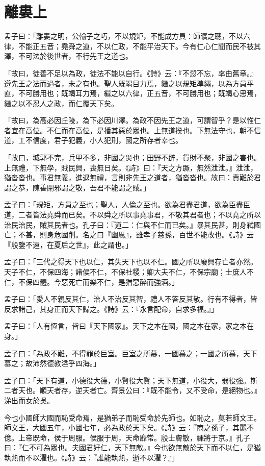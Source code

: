 \documentclass[12pt,a4paper]{ctexbook}
\begin{document}
\section{離婁上}
孟子曰：「離婁之明，公輸子之巧，不以規矩，不能成方員：師曠之聰，不以六律，不能正五音；堯舜之道，不以仁政，不能平治天下。今有仁心仁聞而民不被其澤，不可法於後世者，不行先王之道也。\par
「故曰，徒善不足以為政，徒法不能以自行。《詩》云：『不愆不忘，率由舊章。』遵先王之法而過者，未之有也。聖人既竭目力焉，繼之以規矩準繩，以為方員平直，不可勝用也；既竭耳力焉，繼之以六律，正五音，不可勝用也；既竭心思焉，繼之以不忍人之政，而仁覆天下矣。\par
「故曰，為高必因丘陵，為下必因川澤。為政不因先王之道，可謂智乎？是以惟仁者宜在高位。不仁而在高位，是播其惡於眾也。上無道揆也。下無法守也，朝不信道，工不信度，君子犯義，小人犯刑，國之所存者幸也。\par
「故曰，城郭不完，兵甲不多，非國之災也；田野不辟，貨財不聚，非國之害也。上無禮，下無學，賊民興，喪無日矣。《詩》曰：『天之方蹶，無然泄泄。』泄泄，猶沓沓也。事君無義，進退無禮，言則非先王之道者，猶沓沓也。故曰：責難於君謂之恭，陳善閉邪謂之敬，吾君不能謂之賊。」\par
孟子曰：「規矩，方員之至也；聖人，人倫之至也。欲為君盡君道，欲為臣盡臣道，二者皆法堯舜而已矣。不以舜之所以事堯事君，不敬其君者也；不以堯之所以治民治民，賊其民者也。孔子曰：『道二：仁與不仁而已矣。』暴其民甚，則身弒國亡；不甚，則身危國削。名之曰『幽厲』，雖孝子慈孫，百世不能改也。《詩》云『殷鑒不遠，在夏后之世』，此之謂也。」\par
孟子曰：「三代之得天下也以仁，其失天下也以不仁。國之所以廢興存亡者亦然。天子不仁，不保四海；諸侯不仁，不保社稷；卿大夫不仁，不保宗廟；士庶人不仁，不保四體。今惡死亡而樂不仁，是猶惡醉而強酒。」\par
孟子曰：「愛人不親反其仁，治人不治反其智，禮人不答反其敬。行有不得者，皆反求諸己，其身正而天下歸之。《詩》云：『永言配命，自求多福。』」\par
孟子曰：「人有恆言，皆曰『天下國家』。天下之本在國，國之本在家，家之本在身。」\par
孟子曰：「為政不難，不得罪於巨室。巨室之所慕，一國慕之；一國之所慕，天下慕之；故沛然德教溢乎四海。」\par
孟子曰：「天下有道，小德役大德，小賢役大賢；天下無道，小役大，弱役強。斯二者天也。順天者存，逆天者亡。齊景公曰：『既不能令，又不受命，是絕物也。』涕出而女於吳。\par
今也小國師大國而恥受命焉，是猶弟子而恥受命於先師也。如恥之，莫若師文王。師文王，大國五年，小國七年，必為政於天下矣。《詩》云：『商之孫子，其麗不億。上帝既命，侯于周服。侯服于周，天命靡常。殷士膚敏，祼將于京。』孔子曰：『仁不可為眾也。夫國君好仁，天下無敵。』今也欲無敵於天下而不以仁，是猶執熱而不以濯也。《詩》云：『誰能執熱，逝不以濯？』」\par
\end{document}
